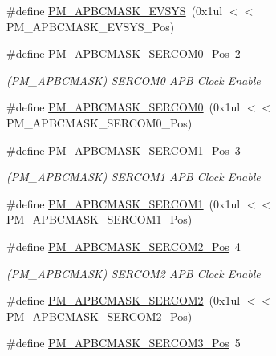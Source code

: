 \begin{DoxyCompactItemize}
\#define \mbox{\hyperlink{group___s_a_m_d21___p_m_ga20629d139cb27baf81b116cab31fa4f4}{P\+M\+\_\+\+A\+P\+B\+C\+M\+A\+S\+K\+\_\+\+E\+V\+S\+YS}}~(0x1ul $<$$<$ P\+M\+\_\+\+A\+P\+B\+C\+M\+A\+S\+K\+\_\+\+E\+V\+S\+Y\+S\+\_\+\+Pos)
\item 
\#define \mbox{\hyperlink{group___s_a_m_d21___p_m_gacf01ff0bb8d83c46b1a9e320c7dafcfc}{P\+M\+\_\+\+A\+P\+B\+C\+M\+A\+S\+K\+\_\+\+S\+E\+R\+C\+O\+M0\+\_\+\+Pos}}~2
\begin{DoxyCompactList}\small\item\em (P\+M\+\_\+\+A\+P\+B\+C\+M\+A\+SK) S\+E\+R\+C\+O\+M0 A\+PB Clock Enable \end{DoxyCompactList}\item 
\#define \mbox{\hyperlink{group___s_a_m_d21___p_m_ga52b1de678a76efd90483d08005aca6e3}{P\+M\+\_\+\+A\+P\+B\+C\+M\+A\+S\+K\+\_\+\+S\+E\+R\+C\+O\+M0}}~(0x1ul $<$$<$ P\+M\+\_\+\+A\+P\+B\+C\+M\+A\+S\+K\+\_\+\+S\+E\+R\+C\+O\+M0\+\_\+\+Pos)
\item 
\#define \mbox{\hyperlink{group___s_a_m_d21___p_m_ga9234f4a8ac9479a746e19a58337d3839}{P\+M\+\_\+\+A\+P\+B\+C\+M\+A\+S\+K\+\_\+\+S\+E\+R\+C\+O\+M1\+\_\+\+Pos}}~3
\begin{DoxyCompactList}\small\item\em (P\+M\+\_\+\+A\+P\+B\+C\+M\+A\+SK) S\+E\+R\+C\+O\+M1 A\+PB Clock Enable \end{DoxyCompactList}\item 
\#define \mbox{\hyperlink{group___s_a_m_d21___p_m_gaf674a3f646bbf20ecb219305cd18940f}{P\+M\+\_\+\+A\+P\+B\+C\+M\+A\+S\+K\+\_\+\+S\+E\+R\+C\+O\+M1}}~(0x1ul $<$$<$ P\+M\+\_\+\+A\+P\+B\+C\+M\+A\+S\+K\+\_\+\+S\+E\+R\+C\+O\+M1\+\_\+\+Pos)
\item 
\#define \mbox{\hyperlink{group___s_a_m_d21___p_m_gac08c4dae369adde60b3784685995e796}{P\+M\+\_\+\+A\+P\+B\+C\+M\+A\+S\+K\+\_\+\+S\+E\+R\+C\+O\+M2\+\_\+\+Pos}}~4
\begin{DoxyCompactList}\small\item\em (P\+M\+\_\+\+A\+P\+B\+C\+M\+A\+SK) S\+E\+R\+C\+O\+M2 A\+PB Clock Enable \end{DoxyCompactList}\item 
\#define \mbox{\hyperlink{group___s_a_m_d21___p_m_gad18db1c295d06722376df5cbb4b600cf}{P\+M\+\_\+\+A\+P\+B\+C\+M\+A\+S\+K\+\_\+\+S\+E\+R\+C\+O\+M2}}~(0x1ul $<$$<$ P\+M\+\_\+\+A\+P\+B\+C\+M\+A\+S\+K\+\_\+\+S\+E\+R\+C\+O\+M2\+\_\+\+Pos)
\item 
\#define \mbox{\hyperlink{group___s_a_m_d21___p_m_gac96ec6b5888b3d60c109994307b4450a}{P\+M\+\_\+\+A\+P\+B\+C\+M\+A\+S\+K\+\_\+\+S\+E\+R\+C\+O\+M3\+\_\+\+Pos}}~5

\end{DoxyCompactItemize}
